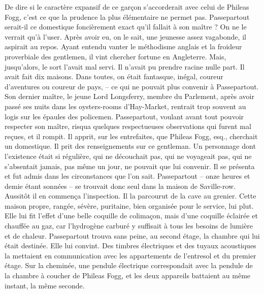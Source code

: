 \documentclass[12pt,a4paper,openany]{book}
\begin{document}
                De dire si le caractère expansif de ce garçon s’accorderait avec celui de Phileas Fogg, c’est ce que la prudence la plus élémentaire ne permet pas. Passepartout serait-il ce domestique foncièrement exact qu’il fallait à son maître ? On ne le verrait qu’à l’user. Après avoir eu, on le sait, une jeunesse assez vagabonde, il aspirait au repos. Ayant entendu vanter le méthodisme anglais et la froideur proverbiale des gentlemen, il vint chercher fortune en Angleterre. Mais, jusqu’alors, le sort l’avait mal servi. Il n’avait pu prendre racine nulle part. Il avait fait dix maisons. Dans toutes, on était fantasque, inégal, coureur d’aventures ou coureur de pays, – ce qui ne pouvait plus convenir à Passepartout. Son dernier maître, le jeune Lord Longsferry, membre du Parlement, après avoir passé ses nuits dans les \og oysters-rooms \fg d’Hay-Market, rentrait trop souvent au logis sur les épaules des policemen. Passepartout, voulant avant tout pouvoir respecter son maître, risqua quelques respectueuses observations qui furent mal reçues, et il rompit. Il apprit, sur les entrefaites, que Phileas Fogg, esq., cherchait un domestique. Il prit des renseignements sur ce gentleman. Un personnage dont l’existence était si régulière, qui ne découchait pas, qui ne voyageait pas, qui ne s’absentait jamais, pas même un jour, ne pouvait que lui convenir. Il se présenta et fut admis dans les circonstances que l’on sait.
                Passepartout – onze heures et demie étant sonnées – se trouvait donc seul dans la maison de Saville-row. Aussitôt il en commença l’inspection. Il la parcourut de la cave au grenier. Cette maison propre, rangée, sévère, puritaine, bien organisée pour le service, lui plut. Elle lui fit l’effet d’une belle coquille de colimaçon, mais d’une coquille éclairée et chauffée au gaz, car l’hydrogène carburé y suffisait à tous les besoins de lumière et de chaleur. Passepartout trouva sans peine, au second étage, la chambre qui lui était destinée. Elle lui convint. Des timbres électriques et des tuyaux acoustiques la mettaient en communication avec les appartements de l’entresol et du premier étage. Sur la cheminée, une pendule électrique correspondait avec la pendule de la chambre à coucher de Phileas Fogg, et les deux appareils battaient au même instant, la même seconde.
\end{document}
